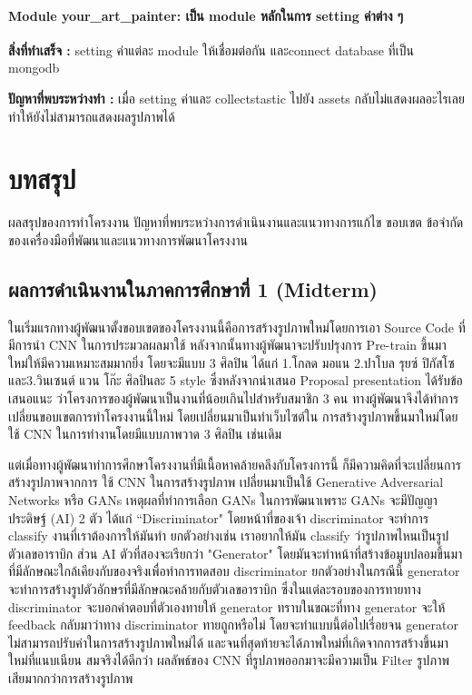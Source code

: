 \documentclass[12pt,oneside,openright,a4paper]{cpe-thai-project}
\begin{document}
\subsubsection{Module your\_art\_painter: เป็น module หลักในการ setting ค่าต่าง ๆ}
\textbf{สิ่งที่ทำเสร็จ :} setting ค่าแต่ละ module ให้เชื่อมต่อกัน และconnect database ที่เป็น mongodb

\textbf{ปัญหาที่พบระหว่างทำ :} เมื่อ setting ค่าและ collectstastic ไปยัง assets กลับไม่แสดงผลอะไรเลย ทำให้ยังไม่สามารถแสดงผลรูปภาพได้




\chapter{บทสรุป}

ผลสรุปของการทำโครงงาน ปัญหาที่พบระหว่างการดำเนินงานและแนวทางการแก้ไข ขอบเขต ข้อจำกัดของเครื่องมือที่พัฒนาและแนวทางการพัฒนาโครงงาน

\section{ผลการดำเนินงานในภาคการศึกษาที่ 1 (Midterm)}
ในเริ่มแรกทางผู้พัฒนาตั้งขอบเขตของโครงงานนี้คือการสร้างรูปภาพใหม่โดยการเอา Source Code ที่มีการนำ CNN ในการประมวลผลมาใช้ หลังจากนั้นทางผู้พัฒนาจะปรับปรุงการ Pre-train ขึ้นมาใหม่ให้มีความเหมาะสมมากยิ่ง โดยจะมีแบบ 3 ศิลปิน ได้แก่ 1.โกลด มอแน 2.ปาโบล รุยซ์ ปิกัสโซ และ3.วินเซนต์ แวน โก๊ะ ศิลปินละ 5 style ซึ่งหลังจากนำเสนอ Proposal presentation ได้รับข้อเสนอแนะ ว่าโครงการของผู้พัฒนาเป็นงานที่น้อยเกินไปสำหรับสมาชิก 3 คน ทางผู้พัฒนาจึงได้ทำการเปลี่ยนขอบเขตการทำโครงงานนี้ใหม่ โดยเปลี่ยนมาเป็นทำเว็บไซต์ใน การสร้างรูปภาพขึ้นมาใหม่โดยใช้ CNN ในการทำงานโดยมีแบบภาพวาด 3 ศิลปิน เช่นเดิม 

\par\setlength{\parindent}{5ex}
แต่เมื่อทางผู้พัฒนาทำการศึกษาโครงงานที่มีเนื้อหาคล้ายคลึงกับโครงการนี้ ก็มีความคิดที่จะเปลี่ยนการสร้างรูปภาพจากการ ใช้ CNN ในการสร้างรูปภาพ เปลี่ยนมาเป็นใช้  Generative Adversarial Networks หรือ GANs เหตุผลที่ทำการเลือก GANs ในการพัฒนาเพราะ GANs จะมีปัญญาประดิษฐ์ (AI) 2 ตัว ได้แก่ “Discriminator" โดยหน้าที่ของเจ้า discriminator จะทำการ classify งานที่เราต้องการให้มันทำ ยกตัวอย่างเช่น เราอยากให้มัน classify ว่ารูปภาพไหนเป็นรูปตัวเลขอาราบิก ส่วน AI ตัวที่สองจะเรียกว่า "Generator" โดยมันจะทำหน้าที่สร้างข้อมูบปลอมขึ้นมาที่มีลักษณะใกล้เคียงกับของจริงเพื่อทำการทดสอบ discriminator ยกตัวอย่างในกรณีนี้ generator จะทำการสร้างรูปตัวอักษรที่มีลักษณะคล้ายกับตัวเลขอาราบิก ซึ่งในแต่ละรอบของการทายทาง discriminator จะบอกคำตอบที่ตัวเองทายให้ generator ทราบในขณะที่ทาง generator จะให้ feedback กลับมาว่าทาง discriminator ทายถูกหรือไม่ โดยจะทำแบบนี้ต่อไปเรี่อยจน generator ไม่สามารถปรับค่าในการสร้างรูปภาพใหม่ได้ และจนที่สุดท้ายจะได้ภาพใหม่ที่เกิดจากการสร้างขึ้นมาใหม่ที่แนบเนียน สมจริงได้ดีกว่า ผลลัพธ์ของ CNN ที่รูปภาพออกมาจะมีความเป็น Filter รูปภาพเสียมากกว่าการสร้างรูปภาพ 
\end{document}
